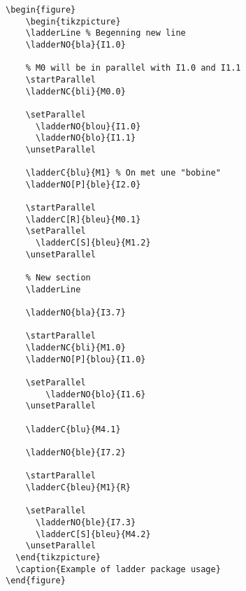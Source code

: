 \documentclass[a4paper]{article}
\begin{document}
\begin{verbatim}
\begin{figure}
    \begin{tikzpicture}
    \ladderLine % Begenning new line
    \ladderNO{bla}{I1.0}

    % M0 will be in parallel with I1.0 and I1.1
    \startParallel 
    \ladderNC{bli}{M0.0}

    \setParallel 
      \ladderNO{blou}{I1.0}
      \ladderNO{blo}{I1.1}
    \unsetParallel

    \ladderC{blu}{M1} % On met une "bobine"
    \ladderNO[P]{ble}{I2.0}

    \startParallel
    \ladderC[R]{bleu}{M0.1}
    \setParallel
      \ladderC[S]{bleu}{M1.2}
    \unsetParallel

    % New section
    \ladderLine

    \ladderNO{bla}{I3.7}

    \startParallel
    \ladderNC{bli}{M1.0}
    \ladderNO[P]{blou}{I1.0}

    \setParallel
        \ladderNO{blo}{I1.6}
    \unsetParallel

    \ladderC{blu}{M4.1}

    \ladderNO{ble}{I7.2}

    \startParallel
    \ladderC{bleu}{M1}{R}

    \setParallel
      \ladderNO{ble}{I7.3}
      \ladderC[S]{bleu}{M4.2}
    \unsetParallel
  \end{tikzpicture}
  \caption{Example of ladder package usage}
\end{figure}
\end{verbatim}
\end{document}
